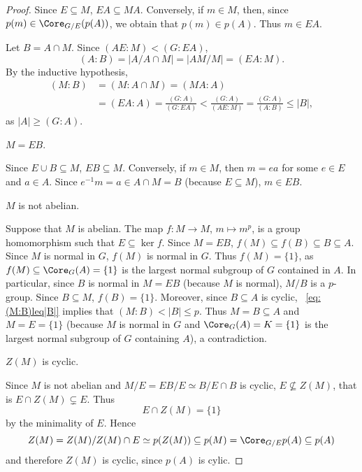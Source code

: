\begin{proof}
	Since $E\subseteq M$, $EA\subseteq MA$. Conversely, if $m\in M$, 
	then, since $p(m)\in\Core_{G/E}(p(A))$, we obtain that 
	$p(m)\in p(A)$. Thus $m\in EA$. 

	\medskip
	Let $B=A\cap M$. Since $(AE:M)<(G:EA)$, 
	\[
	(A:B)=|A/A\cap M|=|AM/M|=(EA:M).
	\]
	By the inductive hypothesis, 
	\begin{equation}
		\label{eq:(M:B)leq|B|}
	\begin{aligned}
		(M:B)&=(M:A\cap M)=(MA:A)\\
		&=(EA:A)
		=\frac{(G:A)}{(G:EA)}
		<\frac{(G:A)}{(AE:M)}
		=\frac{(G:A)}{(A:B)}\leq |B|, 
	\end{aligned}
	\end{equation}
	as $|A|\geq (G:A)$. 

	\begin{claim}
		$M=EB$.
	\end{claim}

	Since $E\cup B\subseteq M$, $EB\subseteq M$. Conversely, if 
	$m\in M$, then $m=ea$ for some $e\in E$ and $a\in A$. Since $e^{-1}m=a\in
	A\cap M=B$ (because $E\subseteq M$), $m\in EB$.

	\begin{claim}
		$M$ is not abelian. 
	\end{claim}

	Suppose that $M$ is abelian. The map $f\colon M\to M$, $m\mapsto
	m^p$, is a group homomorphism such that $E \subseteq\ker f$. Since $M=EB$,
	$f(M)\subseteq f(B)\subseteq B\subseteq A$. Since $M$ is normal in $G$,
	$f(M)$ is normal in $G$. Thus $f(M)=\{1\}$, as $f(M)\subseteq\Core_G(A)=\{1\}$ is the largest normal subgroup of $G$ contained in $A$. In particular, since $B$ is normal in $M=EB$ (because $M$ is normal), $M/B$ is a $p$-group. Since $B\subseteq M$,  $f(B)=\{1\}$. Moreover, since 
	$B\subseteq A$ is cyclic, ~\eqref{eq:(M:B)leq|B|} implies that  
	$(M:B)<|B|\leq p$. Thus $M=B\subseteq A$ and $M=E=\{1\}$ (because 
	$M$ is normal in $G$ and $\Core_G(A)=K=\{1\}$ is the largest normal subgroup of $G$ containing $A$), a contradiction. 
	
	\begin{claim}
		$Z(M)$  is cyclic. 
	\end{claim}

	Since $M$ is not abelian and $M/E=EB/E\simeq B/E\cap B$ is cyclic,
	$E\not\subseteq Z(M)$, that is $E\cap
	Z(M)\subsetneq E$. Thus  
	\begin{equation}
		\label{equation:EcapZ(M)}
		E\cap Z(M)=\{1\}
	\end{equation}
	by the minimality of $E$. Hence  
	\[
	Z(M)=Z(M)/Z(M)\cap E\simeq p(Z(M))\subseteq p(M)=\Core_{G/E}p(A)\subseteq p(A)
	\]
	and therefore $Z(M)$ is cyclic, since $p(A)$ is cylic. 


\end{proof}
